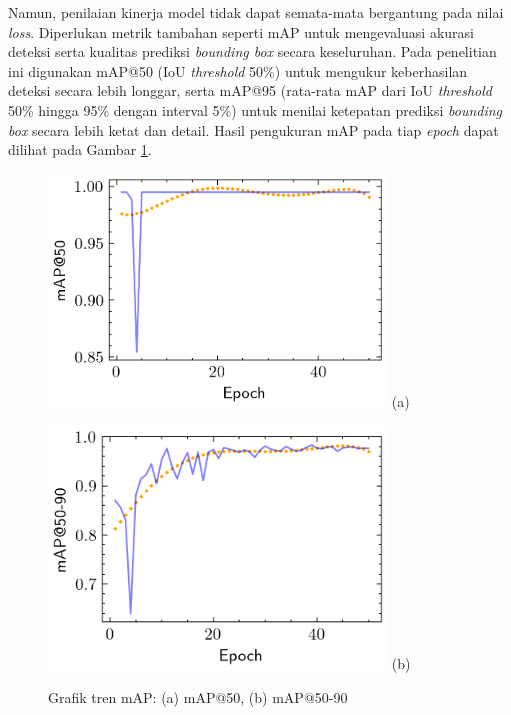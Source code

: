Namun, penilaian kinerja model tidak dapat semata-mata bergantung
pada nilai \textit{loss}. Diperlukan metrik tambahan seperti mAP
untuk mengevaluasi akurasi deteksi serta kualitas prediksi
\textit{bounding box} secara keseluruhan. Pada penelitian ini
digunakan mAP@50 (IoU \textit{threshold} 50\%) untuk mengukur
keberhasilan deteksi secara lebih longgar, serta mAP@95 (rata-rata
mAP dari IoU \textit{threshold} 50\% hingga 95\% dengan interval 5\%)
untuk menilai ketepatan prediksi \textit{bounding box} secara lebih
ketat dan detail. Hasil pengukuran mAP pada tiap \textit{epoch} dapat
dilihat pada Gambar \ref{fig:map}.

\begin{figure}[H]
  \centering
  \begin{minipage}[]{\textwidth}
    \centering
    \includegraphics[width=0.8\textwidth]{gambar/map50.png}
    (a)
  \end{minipage}
  \vspace{1em}

  \begin{minipage}{\textwidth}
    \centering
    \includegraphics[width=0.8\textwidth]{gambar/map5090.png}
    (b)
  \end{minipage}
  \caption{Grafik tren mAP: (a) mAP@50, (b) mAP@50-90}
  \label{fig:map}
  \vspace{-1em}
\end{figure}

